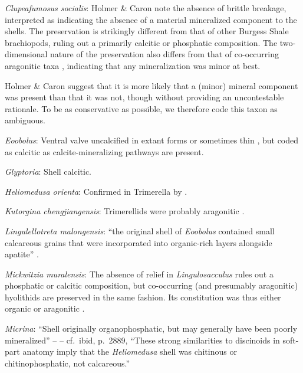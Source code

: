 \documentclass[openany]{book}
\theoremstyle{definition}
\theoremstyle{definition}
\theoremstyle{definition}
\theoremstyle{remark}
\begin{document}
\hypertarget{Clupeafumosus_socialis-coding-122}{}
\emph{Clupeafumosus socialis}: Holmer \& Caron
\citeyearpar{Holmer2006Aspinose} note the absence of brittle breakage,
interpreted as indicating the absence of a material mineralized
component to the shells. The preservation is strikingly different from
that of other Burgess Shale brachiopods, ruling out a primarily calcitic
or phosphatic composition. The two-dimensional nature of the
preservation also differs from that of co-occurring aragonitic taxa
\citep[hyoliths;][ p.~273]{Holmer2006Aspinose}, indicating that any
mineralization was minor at best.

Holmer \& Caron \citeyearpar[p.~286]{Holmer2006Aspinose} suggest that it
is more likely that a (minor) mineral component was present than that it
was not, though without providing an uncontestable rationale. To be as
conservative as possible, we therefore code this taxon as ambiguous.

\hypertarget{Eoobolus-coding-122}{}
\emph{Eoobolus}: Ventral valve uncalcified in extant forms or sometimes
thin \citep{Williams2000LinguliformeaCraniiformea}, but coded as
calcitic as calcite-mineralizing pathways are present.

\hypertarget{Glyptoria-coding-122}{}
\emph{Glyptoria}: Shell calcitic.

\hypertarget{Heliomedusa_orienta-coding-122}{}
\emph{Heliomedusa orienta}: Confirmed in Trimerella by
\citet{Balthasar2011Relicaragonite}.

\hypertarget{Kutorgina_chengjiangensis-coding-122}{}
\emph{Kutorgina chengjiangensis}: Trimerellids were probably aragonitic
\citep{Williams2000LinguliformeaCraniiformea}.

\hypertarget{Lingulellotreta_malongensis-coding-122}{}
\emph{Lingulellotreta malongensis}: ``the original shell of
\emph{Eoobolus} contained small calcareous grains that were incorporated
into organic-rich layers alongside apatite''
\citep{Balthasar2007Anearly}.

\hypertarget{Mickwitzia_muralensis-coding-122}{}
\emph{Mickwitzia muralensis}: The absence of relief in
\emph{Lingulosacculus} rules out a phosphatic or calcitic composition,
but co-occurring (and presumably aragonitic) hyolithids are preserved in
the same fashion. Its constitution was thus either organic or aragonitic
\citep{Balthasar2009EarlyCambrian}.

\hypertarget{Micrina-coding-122}{}
\emph{Micrina}: ``Shell originally organophosphatic, but may generally
have been poorly mineralized'' -- \citet{Williams2007Supplement} --
cf.~ibid, p.~2889, ``These strong similarities to discinoids in
soft-part anatomy imply that the \emph{Heliomedusa} shell was chitinous
or chitinophosphatic, not calcareous.''
\end{document}
